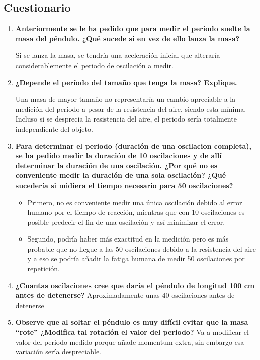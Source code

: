 \subsection{Cuestionario}
\begin{enumerate}
    \item \textbf{Anteriormente se le ha pedido que para medir el periodo suelte la masa del péndulo. ¿Qué sucede si en vez de ello lanza la masa?}

    Si se lanza la masa, se tendría una aceleración inicial que alteraría considerablemente el periodo de oscilación a medir.
    \item \textbf{¿Depende el per\'iodo del tamaño que tenga la masa? Explique.}

    
Una masa de mayor tamaño no representaría un cambio apreciable a la medición del periodo a pesar de la resistencia del aire, siendo esta mínima. Incluso si se desprecia la resistencia del aire, el periodo sería totalmente independiente del objeto.
    \item \textbf{Para determinar el periodo (duración de una oscilacion completa), se ha pedido medir la duración de 10 oscilaciones y de allí determinar la duración de una oscilación. ¿Por qué no es conveniente medir la duración de una sola oscilación? ¿Qué sucedería si midiera el tiempo necesario para 50 oscilaciones?}
    \begin{itemize}
        \item Primero, no es conveniente medir una única oscilación debido al error humano por el tiempo de reacción, mientras que con 10 oscilaciones es posible predecir el fin de una oscilación y así minimizar el error.
        \item Segundo, podría haber más exactitud en la medición pero es más probable que no llegue a las 50 oscilaciones debido a la resistencia del aire y a eso se podría añadir la fatiga humana de medir 50 oscilaciones por repetición. 
    \end{itemize}

    \item \textbf{¿Cuantas oscilaciones cree que daria el péndulo de longitud 100 cm antes de detenerse?}
Aproximadamente unas 40 oscilaciones antes de detenerse  
    \item \textbf{Observe que al soltar el p\'endulo es muy dif\'icil evitar que la masa “rote” ¿Modifica tal rotación el valor del periodo?}
Va a modificar el valor del periodo medido porque añade momentum extra, sin embargo esa variación sería despreciable. 

\end{enumerate}
